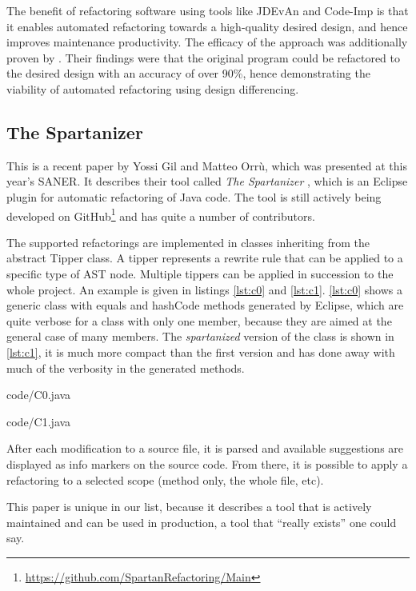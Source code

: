 \documentclass[conference,compsoc,a4paper]{IEEEtran}
\newcommand{\code}[1]{{\small\ttfamily #1}}
\newcommand{\JDEvAn}{\mbox{JDEvAn}\xspace}
\begin{document}
The benefit of refactoring software using tools like \JDEvAn and Code-Imp is that it enables automated refactoring 
towards a high-quality desired design, and hence improves maintenance productivity. The efficacy of the approach was 
additionally proven by \cite{design-diff}. Their findings were that the original program could be refactored to the 
desired design with an accuracy of over 90\%, hence demonstrating the viability of automated refactoring using design 
differencing.

\subsection{The Spartanizer} \label{sec:sparta}

This is a recent paper by Yossi Gil and Matteo Orrù, which was presented at this year's SANER. It describes their tool 
called \emph{The Spartanizer} \cite{sparta}, which is an Eclipse plugin for automatic refactoring of Java code. The 
tool is still actively being developed on GitHub\footnote{\url{https://github.com/SpartanRefactoring/Main}} and has 
quite a number of contributors.

The supported refactorings are implemented in classes inheriting from the abstract \code{Tipper} class. A tipper 
represents a rewrite rule that can be applied to a specific type of AST node. Multiple tippers can be applied in 
succession to the whole project. An example is given in listings \ref{lst:c0} and \ref{lst:c1}. \autoref{lst:c0} shows 
a generic class with \code{equals} and \code{hashCode} methods generated by Eclipse, which are quite verbose for a 
class with only one member, because they are aimed at the general case of many members. The \emph{spartanized} version 
of the class is shown in \autoref{lst:c1}, it is much more compact than the first version and has done away with much 
of the verbosity in the generated methods.


  {code/C0.java}


  {code/C1.java}

After each modification to a source file, it is parsed and available suggestions are displayed as info markers on the 
source code. From there, it is possible to apply a refactoring to a selected scope (method only, the whole file, etc).

This paper is unique in our list, because it describes a tool that is actively maintained and can be used in 
production, a tool that \enquote{really exists} one could say.
\end{document}
